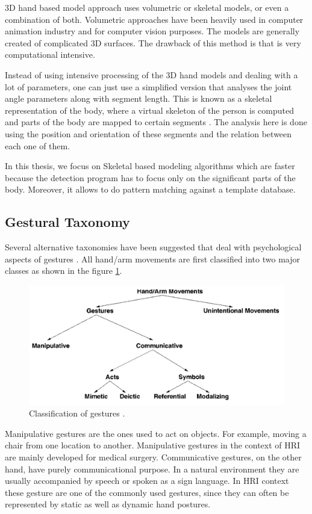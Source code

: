 3D hand based model approach uses volumetric or skeletal models, or even a combination of  both. Volumetric approaches have been heavily used in computer animation industry and for computer vision purposes. The models are generally created of complicated 3D surfaces. The drawback of this method is that is very computational intensive. 

Instead of using intensive processing of the 3D hand models and dealing with a lot of parameters, one can just use a simplified version that analyses the joint angle parameters along with segment length. This is known as a skeletal representation of the body, where a virtual skeleton of the person is computed and parts of the body are mapped to certain segments \cite{4}. The analysis here is done using the position and orientation of these segments and the relation between each one of them.

In this thesis, we focus on Skeletal based modeling algorithms which are faster because the detection program has to focus only on the significant parts of the body. Moreover, it allows to do pattern matching against a template database. 

\subsection{Gestural Taxonomy }
Several alternative taxonomies have been suggested that deal with psychological aspects of gestures \cite{3}. All hand/arm movements are first classified into two major classes as shown in the figure \ref{fig:ges:tax}.

\begin{figure}
	[h] \centering 
	\includegraphics[width=12cm]{figures/ges-tax.png} 
	\caption{Classification of gestures \cite{3}.}
	\label{fig:ges:tax} 
\end{figure}

Manipulative gestures are the ones used to act on objects. For example, moving a chair from one location to another. Manipulative gestures in the context of HRI are mainly developed for medical surgery. Communicative gestures, on the other hand, have purely communicational purpose. In a natural environment they are usually accompanied by speech or spoken as a sign language. In HRI context these gesture are one of the commonly used gestures, since they can often be represented by static as well as dynamic hand postures.

